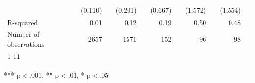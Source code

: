 \documentclass{article}
\begin{document}
\begin{table}[!h]
\begin{tabular}{lllllllllll}
\multicolumn{1}{l}{} &
  \multicolumn{1}{r}{(0.110)} &
  \multicolumn{1}{l}{} &
  \multicolumn{1}{r}{(0.201)} &
  \multicolumn{1}{l}{} &
  \multicolumn{1}{r}{(0.667)} &
  \multicolumn{1}{l}{} &
  \multicolumn{1}{r}{(1.572)} &
  \multicolumn{1}{l}{} &
  \multicolumn{1}{r}{(1.554)} &
  \multicolumn{1}{l}{} \\
\multicolumn{1}{l}{R-squared} &
  \multicolumn{1}{r}{0.01} &
  \multicolumn{1}{l}{} &
  \multicolumn{1}{r}{0.12} &
  \multicolumn{1}{l}{} &
  \multicolumn{1}{r}{0.19} &
  \multicolumn{1}{l}{} &
  \multicolumn{1}{r}{0.50} &
  \multicolumn{1}{l}{} &
  \multicolumn{1}{r}{0.48} &
  \multicolumn{1}{l}{} \\
\multicolumn{1}{l}{Number of observations} &
  \multicolumn{1}{r}{2657} &
  \multicolumn{1}{l}{} &
  \multicolumn{1}{r}{1571} &
  \multicolumn{1}{l}{} &
  \multicolumn{1}{r}{152} &
  \multicolumn{1}{l}{} &
  \multicolumn{1}{r}{96} &
  \multicolumn{1}{l}{} &
  \multicolumn{1}{r}{98} &
  \multicolumn{1}{l}{} \\
\cline{1-11}
\end{tabular}

\footnotesize{
*** p$<$.001, ** p$<$.01, * p$<$.05
}
\end{table}
\end{document}
